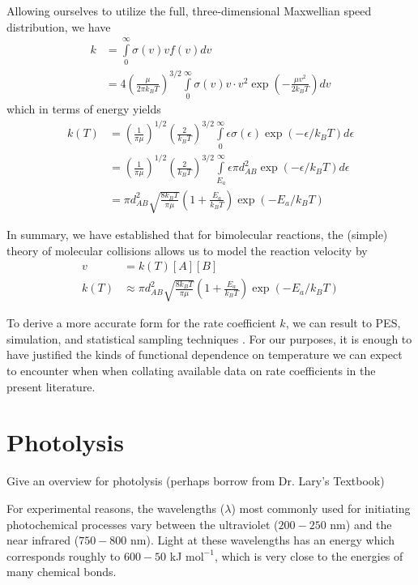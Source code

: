 Allowing ourselves to utilize the full, three-dimensional Maxwellian speed distribution, we have
\begin{equation}
  \begin{aligned}
  k &= \int\limits_0^\infty \sigma(v)v f(v) dv \\
  &= 4\left(\frac{\mu}{2\pi k_BT} \right)^{3/2}\int\limits_0^\infty \sigma(v)v \cdot v^2\exp\left(-\frac{\mu v^2}{2k_BT} \right)dv
  \end{aligned}
\end{equation}
which in terms of energy yields
\begin{equation}
  \begin{aligned}
  k(T) &= \left(\frac{1}{\pi \mu} \right)^{1/2}\left(\frac{2}{k_BT}\right)^{3/2}\int\limits_{0}^{\infty}\epsilon\sigma(\epsilon)\exp(-\epsilon/k_BT)d\epsilon \\
  &= \left(\frac{1}{\pi \mu} \right)^{1/2}\left(\frac{2}{k_BT}\right)^{3/2}\int\limits_{E_a}^{\infty}\epsilon\pi d_{AB}^2\exp(-\epsilon/k_BT)d\epsilon \\
  &= \pi d_{AB}^2 \sqrt{\frac{8k_BT}{\pi \mu}}\left(1 + \frac{E_a}{k_BT} \right)\exp(-E_a/k_BT)
  \end{aligned}
\end{equation}

In summary, we have established that for bimolecular reactions, the (simple) theory of molecular collisions allows us to model the reaction velocity by
\begin{align}
  v &= k(T)[A][B] \\
  k(T) &\approx \pi d_{AB}^2 \sqrt{\frac{8k_BT}{\pi \mu}}\left(1 + \frac{E_a}{k_BT}\right)\exp(-E_a/k_BT)
\end{align}

To derive a more accurate form for the rate coefficient $k$, we can result to PES, simulation, and statistical sampling techniques \cite[for example]{pes-h-h2, pes-for-k}. For our purposes, it is enough to have justified the kinds of functional dependence on temperature we can expect to encounter when when collating available data on rate coefficients in the present literature.

\section{Photolysis}

Give an overview for photolysis (perhaps borrow from Dr. Lary's Textbook)

For experimental reasons, the wavelengths ($\lambda$) most commonly used for initiating photochemical processes vary between the ultraviolet ($200-250$ nm) and the near infrared ($750-800$ nm). Light at these wavelengths has an energy which corresponds roughly to $600-50 $ kJ $\text{mol}^{-1}$, which is very close to the energies of many chemical bonds.



